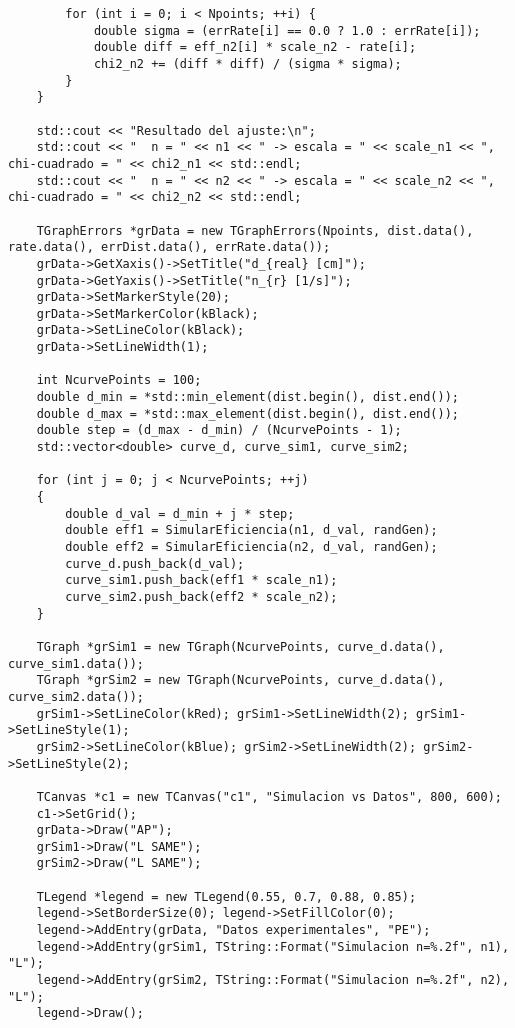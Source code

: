 \begin{lstlisting}
        for (int i = 0; i < Npoints; ++i) {
            double sigma = (errRate[i] == 0.0 ? 1.0 : errRate[i]);
            double diff = eff_n2[i] * scale_n2 - rate[i];
            chi2_n2 += (diff * diff) / (sigma * sigma);
        }
    }

    std::cout << "Resultado del ajuste:\n";
    std::cout << "  n = " << n1 << " -> escala = " << scale_n1 << ", chi-cuadrado = " << chi2_n1 << std::endl;
    std::cout << "  n = " << n2 << " -> escala = " << scale_n2 << ", chi-cuadrado = " << chi2_n2 << std::endl;

    TGraphErrors *grData = new TGraphErrors(Npoints, dist.data(), rate.data(), errDist.data(), errRate.data());
    grData->GetXaxis()->SetTitle("d_{real} [cm]");
    grData->GetYaxis()->SetTitle("n_{r} [1/s]");
    grData->SetMarkerStyle(20);
    grData->SetMarkerColor(kBlack);
    grData->SetLineColor(kBlack);
    grData->SetLineWidth(1);

    int NcurvePoints = 100;
    double d_min = *std::min_element(dist.begin(), dist.end());
    double d_max = *std::max_element(dist.begin(), dist.end());
    double step = (d_max - d_min) / (NcurvePoints - 1);
    std::vector<double> curve_d, curve_sim1, curve_sim2;

    for (int j = 0; j < NcurvePoints; ++j)
    {
        double d_val = d_min + j * step;
        double eff1 = SimularEficiencia(n1, d_val, randGen);
        double eff2 = SimularEficiencia(n2, d_val, randGen);
        curve_d.push_back(d_val);
        curve_sim1.push_back(eff1 * scale_n1);
        curve_sim2.push_back(eff2 * scale_n2);
    }

    TGraph *grSim1 = new TGraph(NcurvePoints, curve_d.data(), curve_sim1.data());
    TGraph *grSim2 = new TGraph(NcurvePoints, curve_d.data(), curve_sim2.data());
    grSim1->SetLineColor(kRed); grSim1->SetLineWidth(2); grSim1->SetLineStyle(1);
    grSim2->SetLineColor(kBlue); grSim2->SetLineWidth(2); grSim2->SetLineStyle(2);

    TCanvas *c1 = new TCanvas("c1", "Simulacion vs Datos", 800, 600);
    c1->SetGrid();
    grData->Draw("AP");
    grSim1->Draw("L SAME");
    grSim2->Draw("L SAME");

    TLegend *legend = new TLegend(0.55, 0.7, 0.88, 0.85);
    legend->SetBorderSize(0); legend->SetFillColor(0);
    legend->AddEntry(grData, "Datos experimentales", "PE");
    legend->AddEntry(grSim1, TString::Format("Simulacion n=%.2f", n1), "L");
    legend->AddEntry(grSim2, TString::Format("Simulacion n=%.2f", n2), "L");
    legend->Draw();


\end{lstlisting}
